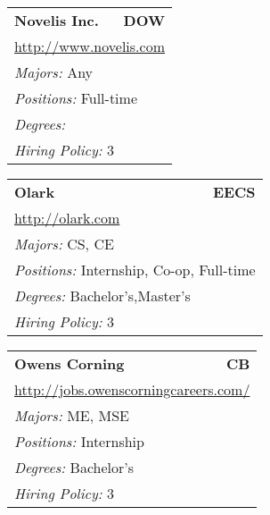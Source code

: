 \documentclass[twoside]{article}
\begin{document}
\begin{center}
\begin{multicols}{3}
\begin{FlushLeft}
\begin{minipage}{.9\columnwidth}
\end{minipage}
 
\begin{minipage}{.9\columnwidth}\begin{tabularx}{.95\columnwidth}{Xr}
                 {\Large\bf Novelis Inc.} & {\Large\bf DOW}\\
    \multicolumn{2}{p{.95\columnwidth}}{\url{http://www.novelis.com}}\\
    \multicolumn{2}{p{.95\columnwidth}}{\emph{Majors:} Any}\\
    \multicolumn{2}{p{.95\columnwidth}}{\emph{Positions:} Full-time}\\
    \multicolumn{2}{p{.95\columnwidth}}{\emph{Degrees:} }\\
    \multicolumn{2}{p{.95\columnwidth}}{\emph{Hiring Policy:} 3}\\
    \end{tabularx}
    
\end{minipage}
 
\begin{minipage}{.9\columnwidth}\begin{tabularx}{.95\columnwidth}{Xr}
                 {\Large\bf Olark} & {\Large\bf EECS}\\
    \multicolumn{2}{p{.95\columnwidth}}{\url{http://olark.com}}\\
    \multicolumn{2}{p{.95\columnwidth}}{\emph{Majors:} CS, CE}\\
    \multicolumn{2}{p{.95\columnwidth}}{\emph{Positions:} Internship, Co-op, Full-time}\\
    \multicolumn{2}{p{.95\columnwidth}}{\emph{Degrees:} Bachelor's,Master's}\\
    \multicolumn{2}{p{.95\columnwidth}}{\emph{Hiring Policy:} 3}\\
    \end{tabularx}
    
\end{minipage}
 
\begin{minipage}{.9\columnwidth}\begin{tabularx}{.95\columnwidth}{Xr}
                 {\Large\bf Owens Corning} & {\Large\bf CB}\\
    \multicolumn{2}{p{.95\columnwidth}}{\url{http://jobs.owenscorningcareers.com/}}\\
    \multicolumn{2}{p{.95\columnwidth}}{\emph{Majors:} ME, MSE}\\
    \multicolumn{2}{p{.95\columnwidth}}{\emph{Positions:} Internship}\\
    \multicolumn{2}{p{.95\columnwidth}}{\emph{Degrees:} Bachelor's}\\
    \multicolumn{2}{p{.95\columnwidth}}{\emph{Hiring Policy:} 3}\\
    \end{tabularx}
    

\end{minipage}
\end{FlushLeft}
\end{multicols}
\end{center}
\end{document}
